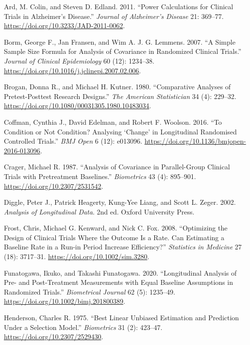 \documentclass[
  11pt,
]{article}
\newlength{\cslhangindent}
\newenvironment{CSLReferences}[2] %
 {\begin{list}{}{%
  \setlength{\itemindent}{0pt}
  \setlength{\leftmargin}{0pt}
  \setlength{\parsep}{0pt}
  \ifodd #1
   \setlength{\leftmargin}{\cslhangindent}
   \setlength{\itemindent}{-1\cslhangindent}
  \fi
  \setlength{\itemsep}{#2\baselineskip}}}
 {\end{list}}
\begin{document}
\protect{}\label{refs}
\begin{CSLReferences}{1}{1}
Ard, M. Colin, and Steven D. Edland. 2011. {``Power Calculations for
Clinical Trials in {Alzheimer's} Disease.''} \emph{Journal of
Alzheimer's Disease} 21: 369--77.
\url{https://doi.org/10.3233/JAD-2011-0062}.

Borm, George F., Jan Fransen, and Wim A. J. G. Lemmens. 2007. {``A
Simple Sample Size Formula for Analysis of Covariance in Randomized
Clinical Trials.''} \emph{Journal of Clinical Epidemiology} 60 (12):
1234--38. \url{https://doi.org/10.1016/j.jclinepi.2007.02.006}.

Brogan, Donna R., and Michael H. Kutner. 1980. {``Comparative Analyses
of Pretest-Posttest Research Designs.''} \emph{The American
Statistician} 34 (4): 229--32.
\url{https://doi.org/10.1080/00031305.1980.10483034}.

Coffman, Cynthia J., David Edelman, and Robert F. Woolson. 2016. {``To
Condition or Not Condition? {Analysing} {`Change'} in Longitudinal
Randomised Controlled Trials.''} \emph{BMJ Open} 6 (12): e013096.
\url{https://doi.org/10.1136/bmjopen-2016-013096}.

Crager, Michael R. 1987. {``Analysis of Covariance in Parallel-Group
Clinical Trials with Pretreatment Baselines.''} \emph{Biometrics} 43
(4): 895--901. \url{https://doi.org/10.2307/2531542}.

Diggle, Peter J., Patrick Heagerty, Kung-Yee Liang, and Scott L. Zeger.
2002. \emph{Analysis of Longitudinal Data}. 2nd ed. Oxford University
Press.

Frost, Chris, Michael G. Kenward, and Nick C. Fox. 2008. {``Optimizing
the Design of Clinical Trials Where the Outcome Is a Rate. {Can}
Estimating a Baseline Rate in a Run-in Period Increase Efficiency?''}
\emph{Statistics in Medicine} 27 (18): 3717--31.
\url{https://doi.org/10.1002/sim.3280}.

Funatogawa, Ikuko, and Takashi Funatogawa. 2020. {``Longitudinal
Analysis of Pre- and Post-Treatment Measurements with Equal Baseline
Assumptions in Randomized Trials.''} \emph{Biometrical Journal} 62 (5):
1235--49. \url{https://doi.org/10.1002/bimj.201800389}.

Henderson, Charles R. 1975. {``Best Linear Unbiased Estimation and
Prediction Under a Selection Model.''} \emph{Biometrics} 31 (2):
423--47. \url{https://doi.org/10.2307/2529430}.


\end{CSLReferences}
\end{document}
